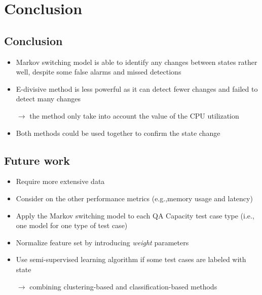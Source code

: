\documentclass{beamer}
\begin{document}

\section{Conclusion}
\subsection{Conclusion}
\begin{frame}
\begin{itemize}
\item Markov switching model is able to identify any changes between states rather well, despite some false alarms and missed detections
\item E-divisive method  is less powerful as it can detect fewer changes and failed to detect many changes

$\rightarrow$ the method only take into account the value of the CPU utilization

\item Both methods could be used together to confirm the state change
\end{itemize}
\end{frame}

\subsection{Future work}
\begin{frame}
\begin{itemize}
\item Require more extensive data
\item Consider on the other performance metrics (e.g.,memory usage and latency) 
\item Apply the Markov switching model to each QA Capacity test case type (i.e., one model for one type of test case)
\item Normalize feature set by introducing \textit{weight} parameters
\item Use semi-supervised learning algorithm if some test cases are labeled with state

$\rightarrow$ combining clustering-based and classification-based methods 
\end{itemize}
\end{frame}
\end{document}
